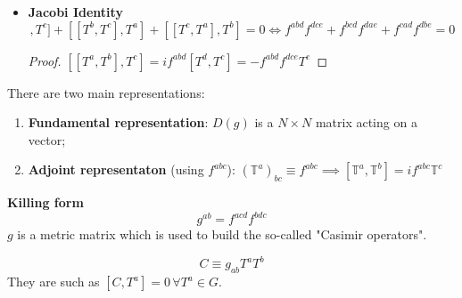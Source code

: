 \documentclass[../../main/main.tex]{subfiles}
\begin{document}
\begin{itemize}
\item \textbf{Jacobi Identity}
\begin{equation*}
[[T^a, T^b], T^c]+[[T^b, T^c], T^a]+[[T^c, T^a], T^b]=0 \iff f^{abd}f^{dce}+ f^{bcd}f^{dae}+ f^{cad}f^{dbe}=0
\end{equation*}
\begin{proof}
$[[T^a, T^b], T^c]=if^{abd}[T^d, T^c] = - f^{abd} f^{dce} T^{e}$
\end{proof}
\end{itemize}
There are two main representations:
\begin{enumerate}
\item \textbf{Fundamental representation}: $D(g)$ is a $N \times N$ matrix acting on a vector;
\item \textbf{Adjoint representaton} (using $f^{abc}$): $(\mathbb{T}^a)_{bc} \equiv f^{abc} \implies [\mathbb{T}^a, \mathbb{T}^b]=i f^{abc} \mathbb{T}^c$
\end{enumerate}

\textbf{Killing form} \newline
\begin{equation*}
g^{ab}=f^{acd}f^{bdc}
\end{equation*}
$g$ is a metric matrix which is used to build the so-called "Casimir operators".

\begin{definition}
\begin{equation*}
C \equiv g_{ab} T^a T^b
\end{equation*}
They are such as $[C, T^a]=0\, \forall T^a \in G$.
\end{definition}
\end{document}
